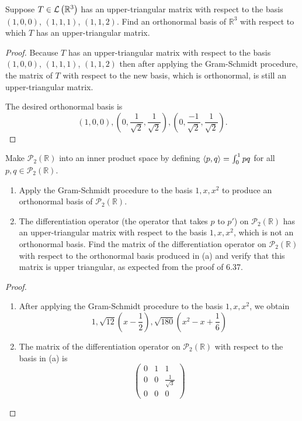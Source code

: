 \begin{exercise}
    Suppose $T \in \mathcal{L}\left({\mathbb{R}^{3}}\right)$ has an upper-triangular matrix with respect to the basis $(1, 0, 0)$, $(1, 1, 1)$, $(1, 1, 2)$. Find an orthonormal basis of $\mathbb{R}^{3}$ with respect to which $T$ has an upper-triangular matrix.
\end{exercise}

\begin{proof}
    Because $T$ has an upper-triangular matrix with respect to the basis $(1, 0, 0)$, $(1, 1, 1)$, $(1, 1, 2)$ then after applying the Gram{-}Schmidt procedure, the matrix of $T$ with respect to the new basis, which is orthonormal, is still an upper-triangular matrix.

    The desired orthonormal basis is
    \[
        (1, 0, 0), \left(0, \frac{1}{\sqrt{2}}, \frac{1}{\sqrt{2}}\right), \left(0, \frac{-1}{\sqrt{2}}, \frac{1}{\sqrt{2}}\right).
    \]
\end{proof}
\newpage

\begin{exercise}
    Make $\mathscr{P}_{2}(\mathbb{R})$ into an inner product space by defining $\left\langle{p, q}\right\rangle = \int^{1}_{0}pq$ for all $p, q \in \mathscr{P}_{2}(\mathbb{R})$.
    \begin{enumerate}[label={(\alph*)}]
        \item Apply the Gram-Schmidt procedure to the basis $1, x, x^{2}$ to produce an orthonormal basis of $\mathscr{P}_{2}(\mathbb{R})$.
        \item The differentiation operator (the operator that takes $p$ to $p'$) on $\mathscr{P}_{2}(\mathbb{R})$ has an upper-triangular matrix with respect to the basis $1, x, x^{2}$, which is not an orthonormal basis. Find the matrix of the differentiation operator on $\mathscr{P}_{2}(\mathbb{R})$ with respect to the orthonormal basis produced in (a) and verify that this matrix is upper triangular, as expected from the proof of 6.37.
    \end{enumerate}
\end{exercise}

\begin{proof}
    \begin{enumerate}[label={(\alph*)}]
        \item After applying the Gram-Schmidt procedure to the basis $1, x, x^{2}$, we obtain
              \[
                  1, \sqrt{12}\left(x - \frac{1}{2}\right), \sqrt{180}\left(x^{2} - x + \frac{1}{6}\right)
              \]
        \item The matrix of the differentiation operator on $\mathscr{P}_{2}(\mathbb{R})$ with respect to the basis in (a) is
              \[
                  \begin{pmatrix}
                      0 & 1 & 1                  \\
                      0 & 0 & \frac{1}{\sqrt{3}} \\
                      0 & 0 & 0
                  \end{pmatrix}
              \]
    \end{enumerate}
\end{proof}
\newpage

